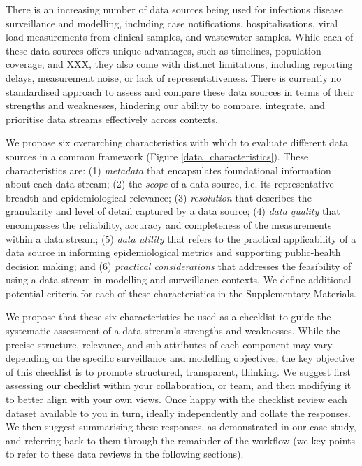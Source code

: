 \documentclass{article}
\begin{document}
There is an increasing number of data sources being used for infectious disease surveillance and modelling, including case notifications, hospitalisations, viral load measurements from clinical samples, and wastewater samples. While each of these data sources offers unique advantages, such as timelines, population coverage, and XXX, they also come with distinct limitations, including reporting delays,  measurement noise, or lack of representativeness. There is currently no standardised approach to assess and compare these data sources in terms of their strengths and weaknesses, hindering our ability to compare, integrate, and prioritise data streams effectively across contexts. 

We propose six overarching characteristics with which to evaluate different data sources in a common framework (Figure \ref{data_characteristics}).  These characteristics are: (1) \textit{metadata}  that encapsulates  foundational information about each data stream; (2) the \textit{scope} of a data source, i.e. its representative breadth and epidemiological relevance; (3) \textit{resolution} that describes the granularity and level of detail captured by a data source; (4) \textit{data quality} that encompasses the reliability, accuracy and completeness of the measurements within a data stream; (5) \textit{data utility} that refers to the practical applicability of a data source in informing epidemiological metrics and supporting public-health decision making; and (6)\textit{ practical considerations} that addresses the feasibility of using a data stream in modelling and surveillance contexts. We define additional potential criteria for each of these characteristics in the Supplementary Materials. 

We propose that these six characteristics be used as a checklist to guide the systematic assessment of a data stream's strengths and weaknesses. While the precise structure, relevance, and sub-attributes of each component may vary depending on the specific surveillance  and modelling objectives, the key objective of this checklist is to promote structured, transparent, thinking. We suggest first assessing our checklist within your collaboration, or team,  and then modifying it to better align with your own views. Once happy with the checklist review each dataset available to you in turn, ideally independently and collate the responses. We then suggest summarising these responses, as demonstrated in our case study, and referring back to them through the remainder of the workflow (we key points to refer to these data reviews in the following sections).
\end{document}
